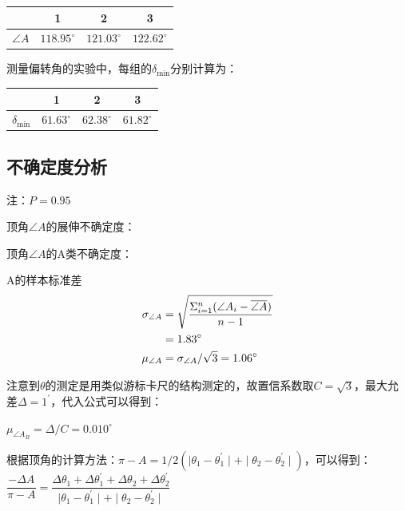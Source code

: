 \documentclass[a4paper]{ltxdoc}
\begin{document}
\begin{multicols}{2}
    \begin{tabular}{|c|c|c|c|}
        \hline
                   & 1                & 2                & 3                \\\hline
        $\angle A$ & $118.95^{\circ}$ & $121.03^{\circ}$ & $122.62^{\circ}$ \\\hline
    \end{tabular}

    \smallskip
    测量偏转角的实验中，每组的$\delta_{\min}$分别计算为：

    \begin{tabular}{|c|c|c|c|}
        \hline
                        & 1               & 2               & 3               \\\hline
        $\delta_{\min}$ & $61.63^{\circ}$ & $62.38^{\circ}$ & $61.82^{\circ}$ \\\hline
    \end{tabular}

    \subsection{不确定度分析}

    注：$P=0.95$

    顶角$\angle A$的展伸不确定度：

    顶角$\angle A$的A类不确定度：

    A的样本标准差
    \begin{equation}
        \begin{aligned}
            \sigma_{\angle A} & = \sqrt{\dfrac{\Sigma_{i=1}^{n}(\angle A_i - \overline{\angle A})} {n-1}} \\
                              & = 1.83^{\circ}                                                            \\
            \mu_{\angle A}    & = \sigma_{\angle A} / \sqrt{3} = 1.06^{\circ}                             \\
        \end{aligned}
        \notag
    \end{equation}

    注意到$\theta$的测定是用类似游标卡尺的结构测定的，故置信系数取$C=\sqrt{3}$，最大允差$\Delta = 1^{\prime}$，代入公式可以得到：

    $\mu_{\angle A_{B}} = \Delta /C = 0.010 ^{\circ}$

    根据顶角的计算方法：$\pi - A = 1/2 (\mid \theta_1 - \theta_1^{\prime}\mid + \mid \theta_2 - \theta_2^{\prime}\mid)$，可以得到：$\dfrac{-\Delta A}{\pi - A} = \dfrac{\Delta \theta_1+ \Delta \theta_1^{\prime} +\Delta \theta_2+ \Delta \theta_2^{\prime}}{\mid \theta_1 - \theta_1^{\prime}\mid + \mid \theta_2 - \theta_2^{\prime}\mid}$


\end{multicols}
\end{document}

